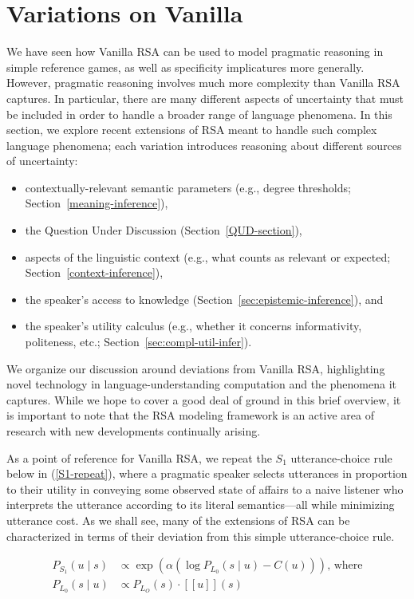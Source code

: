 \documentclass[10pt,letterpaper]{article}
\newcommand{\sem}[1]{\ensuremath{[\![#1]\!]}}
\begin{document}
\section*{Variations on Vanilla} \label{variations}

We have seen how Vanilla RSA can be used to model pragmatic reasoning in simple reference games, as well as specificity implicatures more generally. However, pragmatic reasoning involves much more complexity than Vanilla RSA captures. In particular, there are many different aspects of uncertainty that must be included in order to handle a broader range of language phenomena. In this section, we explore recent extensions of RSA meant to handle such complex language phenomena; each variation introduces reasoning about different sources of uncertainty:
\begin{itemize}
  \item contextually-relevant semantic parameters (e.g., degree thresholds; Section~\ref{meaning-inference}),
  \item the Question Under Discussion (Section~\ref{QUD-section}),
  \item aspects of the linguistic context (e.g., what counts as relevant or expected; Section~\ref{context-inference}),
  \item the speaker's access to knowledge (Section~\ref{sec:epistemic-inference}), and
  \item the speaker's utility calculus (e.g., whether it concerns informativity, politeness, etc.; Section~\ref{sec:compl-util-infer}).
\end{itemize}
We organize our discussion around deviations from Vanilla RSA, highlighting novel technology in language-understanding computation and the phenomena it captures. While we hope to cover a good deal of ground in this brief overview, it is important to note that the RSA modeling framework is an active area of research with new developments continually arising.

As a point of reference for Vanilla RSA, we repeat the $S_1$ utterance-choice rule below in (\ref{S1-repeat}), where a pragmatic speaker selects utterances in proportion to their utility in conveying some observed state of affairs to a naive listener who interprets the utterance according to its literal semantics---all while minimizing utterance cost. As we shall see, many of the extensions of RSA can be characterized in terms of their deviation from this simple utterance-choice rule.

\begin{align} \label{S1-repeat}
  P_{S_1}(u\mid s) & \propto \exp (\alpha (\log P_{L_0}(s \mid u) - C(u))) \text{, where} \\
  P_{L_0}(s \mid u) & \propto P_{L_O}(s)  \cdot \sem{u}(s) \nonumber
\end{align}
\end{document}
